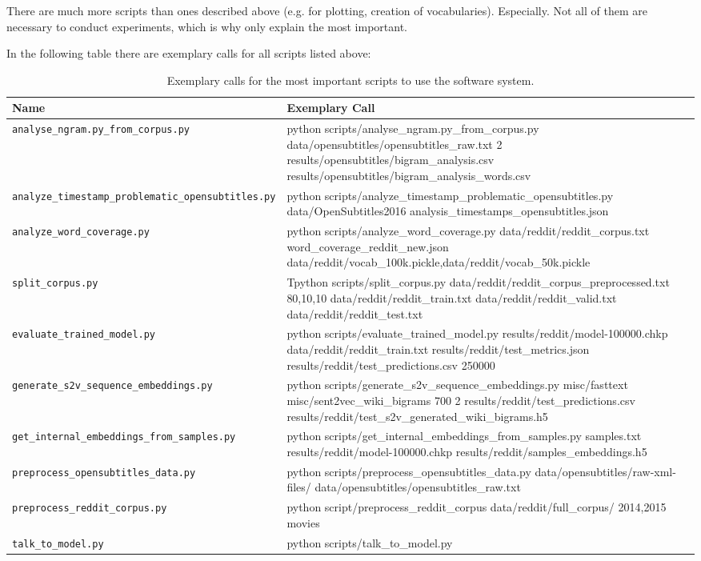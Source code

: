 There are much more scripts than ones described above (e.g. for plotting, creation of vocabularies). Especially. Not all of them are necessary to conduct experiments, which is why only explain the most important.

In the following table there are exemplary calls for all scripts listed above:

\begin{table}[H]
	\centering
	\begin{adjustbox}{max width=\textwidth}
		\begin{tabular}{lp{20cm}}
			\toprule
			Name & Exemplary Call\\ \midrule
			\texttt{analyse{\_}ngram.py{\_}from{\_}corpus.py} & python scripts/analyse{\_}ngram.py{\_}from{\_}corpus.py data/opensubtitles/opensubtitles\_raw.txt 2 results/opensubtitles/bigram\_analysis.csv results/opensubtitles/bigram\_analysis\_words.csv\\
			\texttt{analyze{\_}timestamp{\_}problematic{\_}opensubtitles.py} & python scripts/analyze{\_}timestamp{\_}problematic{\_}opensubtitles.py data/OpenSubtitles2016 analysis\_timestamps\_opensubtitles.json\\
			\texttt{analyze{\_}word{\_}coverage.py} & python scripts/analyze{\_}word{\_}coverage.py data/reddit/reddit\_corpus.txt word\_coverage\_reddit\_new.json data/reddit/vocab\_100k.pickle,data/reddit/vocab\_50k.pickle\\
			\texttt{split{\_}corpus.py} & Tpython scripts/split{\_}corpus.py data/reddit/reddit\_corpus\_preprocessed.txt 80,10,10 data/reddit/reddit\_train.txt data/reddit/reddit\_valid.txt data/reddit/reddit\_test.txt\\
			\texttt{evaluate{\_}trained{\_}model.py} & python scripts/evaluate{\_}trained{\_}model.py results/reddit/model-100000.chkp data/reddit/reddit\_train.txt results/reddit/test\_metrics.json results/reddit/test\_predictions.csv 250000\\
			\texttt{generate{\_}s2v{\_}sequence{\_}embeddings.py} & python scripts/generate{\_}s2v{\_}sequence{\_}embeddings.py misc/fasttext misc/sent2vec\_wiki\_bigrams 700 2 results/reddit/test\_predictions.csv results/reddit/test\_s2v\_generated\_wiki\_bigrams.h5\\
			\texttt{get{\_}internal{\_}embeddings{\_}from{\_}samples.py} & python scripts/get{\_}internal{\_}embeddings{\_}from{\_}samples.py samples.txt results/reddit/model-100000.chkp results/reddit/samples\_embeddings.h5\\
			\texttt{preprocess{\_}opensubtitles{\_}data.py} & python scripts/preprocess\_opensubtitles\_data.py data/opensubtitles/raw-xml-files/ data/opensubtitles/opensubtitles\_raw.txt\\
			\texttt{preprocess{\_}reddit{\_}corpus.py} & python script/preprocess\_reddit\_corpus data/reddit/full\_corpus/ 2014,2015 movies\\
			\texttt{talk{\_}to{\_}model.py} & python scripts/talk\_to\_model.py\\
			\bottomrule
		\end{tabular}
	\end{adjustbox}
	\caption{Exemplary calls for the most important scripts to use the software system.}
\end{table}
